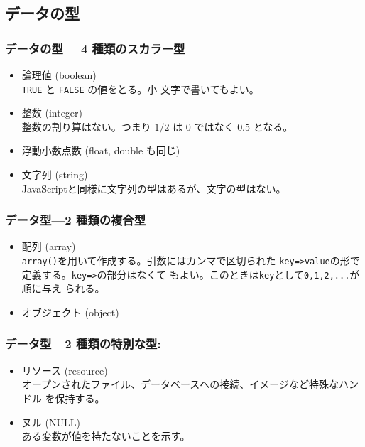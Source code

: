 \documentclass[dvipsk]{beamer}
\begin{document}
\subsection{データの型}
\begin{frame}[containsverbatim]
\frametitle{データの型 ---4 種類のスカラー型}
 \begin{itemize}
  \item 論理値 (boolean)\\\texttt{TRUE} と \texttt{FALSE} の値をとる。小
	文字で書いてもよい。
  \item 整数 (integer)\\整数の割り算はない。つまり $1/2$ は $0$ ではなく
	$0.5$ となる。
  \item 浮動小数点数 (float, double も同じ)
  \item 文字列 (string)\\
JavaScriptと同様に文字列の型はあるが、文字の型はない。
 \end{itemize}
\end{frame}
\begin{frame}[containsverbatim]
\frametitle{データ型---2 種類の複合型}
 \begin{itemize}
  \item 配列 (array)\\
\texttt{array()}を用いて作成する。引数にはカンマで区切られた
	\texttt{key=>value}の形で定義する。\texttt{key=>}の部分はなくて
	もよい。このときは\texttt{key}として\texttt{0,1,2,...}が順に与え
	られる。
  \item オブジェクト (object)
 \end{itemize}
\end{frame}
\begin{frame}[containsverbatim]
\frametitle{データ型---2 種類の特別な型:}
\begin{itemize}
 \item リソース (resource)\\
オープンされたファイル、データベースへの接続、イメージなど特殊なハンドル
       を保持する。
 \item ヌル (NULL)\\
ある変数が値を持たないことを示す。
\end{itemize}
\end{frame}
\end{document}
